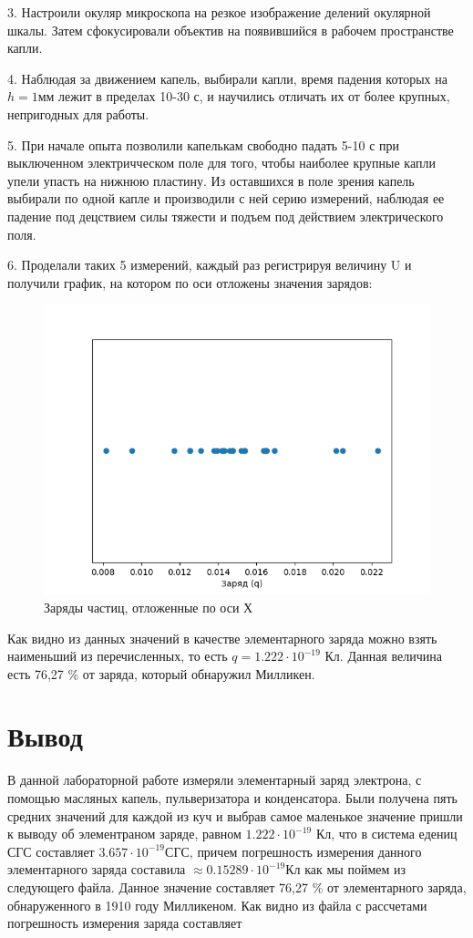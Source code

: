 \documentclass[a4paper,12pt]{article}
\begin{document}
\par 3. Настроили окуляр микроскопа на резкое изображение делений окулярной шкалы. Затем сфокусировали объектив на появившийся в рабочем пространстве капли.
\par 4. Наблюдая за движением капель, выбирали капли, время падения которых на $h = 1 мм$ лежит в пределах 10-30 с, и научились отличать их от более крупных, непригодных для работы.

\par 5. При начале опыта позволили капелькам свободно падать 5-10 с при выключенном электричческом поле для того, чтобы наиболее крупные капли упели упасть на нижнюю пластину. Из оставшихся в поле зрения капель выбирали по одной капле и производили с ней серию измерений, наблюдая ее падение под децствием силы тяжести и подъем под действием электрического поля.

\par 6. Проделали таких 5 измерений, каждый раз регистрируя величину U и получили график, на котором по оси отложены значения зарядов:
\begin{figure}[h!!]
    \centering
    \includegraphics[scale=0.9]{my_graph.png}
    \caption{Заряды частиц, отложенные по оси Х}
    \label{fig:your_label}
\end{figure}
Как видно из данных значений в качестве элементарного заряда можно взять наименьший из перечисленных, то есть $q = 1.222 \cdot 10^{-19}$ Кл. Данная величина есть 76,27 \% от заряда, который обнаружил Милликен.
\section{Вывод}
В данной лабораторной работе измеряли элементарный заряд электрона, с помощью масляных капель, пульверизатора и конденсатора. Были получена пять средних значений для каждой из куч и выбрав самое маленькое значение пришли к выводу об элементраном заряде, равном $1.222 \cdot 10^{-19}$ Кл, что в система едениц СГС составляет $3.657 \cdot 10^{-19} СГС$, причем погрешность измерения данного элементарного заряда составила $\approx 0.15289 \cdot 10^{-19}$Кл как мы поймем из следующего файла. Данное значение составляет 76,27 \% от элементарного заряда, обнаруженного в 1910 году Милликеном. Как видно из файла с рассчетами погрешность измерения заряда составляет
\end{document}
